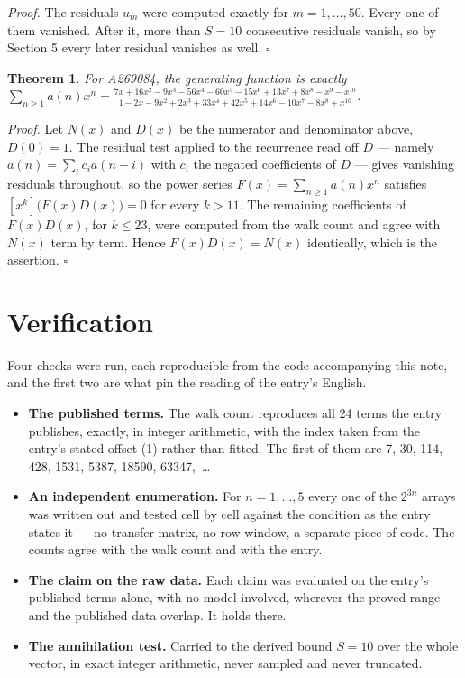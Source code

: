 \documentclass[11pt]{article}
\newtheorem{theorem}{Theorem}
\theoremstyle{definition}
\begin{document}
{\itshape Proof.} The residuals $u_m$ were computed exactly for $m = 1,\dots,50$. Every one of them vanished. After it, more than $S = 10$ consecutive residuals vanish, so by Section 5 every later residual vanishes as well. $\square$

\begin{theorem} For A269084, the generating function is exactly $\sum_{n\ge 1} a(n)x^n = \frac{7x + 16x^{2} - 9x^{3} - 56x^{4} - 60x^{5} - 15x^{6} + 13x^{7} + 8x^{8} - x^{9} - x^{10}}{1 - 2x - 9x^{2} + 2x^{3} + 33x^{4} + 42x^{5} + 14x^{6} - 10x^{7} - 8x^{8} + x^{10}}$.\end{theorem}

{\itshape Proof.} Let $N(x)$ and $D(x)$ be the numerator and denominator above, $D(0)=1$. The residual test applied to the recurrence read off $D$ --- namely $a(n) = \sum_i c_i a(n-i)$ with $c_i$ the negated coefficients of $D$ --- gives vanishing residuals throughout, so the power series $F(x)=\sum_{n\ge 1}a(n)x^n$ satisfies $[x^k]\bigl(F(x)D(x)\bigr) = 0$ for every $k > 11$. The remaining coefficients of $F(x)D(x)$, for $k \le 23$, were computed from the walk count and agree with $N(x)$ term by term. Hence $F(x)D(x) = N(x)$ identically, which is the assertion. $\square$

\section{Verification}

Four checks were run, each reproducible from the code accompanying this note, and the first two are what pin the reading of the entry's English.

\begin{itemize}

\item {\bfseries The published terms.} The walk count reproduces all 24 terms the entry publishes, exactly, in integer arithmetic, with the index taken from the entry's stated offset (1) rather than fitted. The first of them are 7, 30, 114, 428, 1531, 5387, 18590, 63347,~\dots

\item {\bfseries An independent enumeration.} For $n = 1,\dots,5$ every one of the $2^{3n}$ arrays was written out and tested cell by cell against the condition as the entry states it --- no transfer matrix, no row window, a separate piece of code. The counts agree with the walk count and with the entry.

\item {\bfseries The claim on the raw data.} Each claim was evaluated on the entry's published terms alone, with no model involved, wherever the proved range and the published data overlap. It holds there.

\item {\bfseries The annihilation test.} Carried to the derived bound $S = 10$ over the whole vector, in exact integer arithmetic, never sampled and never truncated.

\end{itemize}
\end{document}
